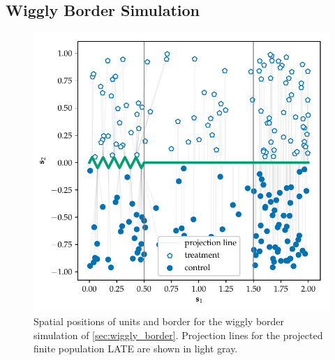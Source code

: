 \subsection{Wiggly Border Simulation}
\label{sec:wiggly_border}

\begin{figure}[tb]
\centering
\includegraphics[height=0.35\textheight]{figures/wiggly_boundaries_setup.pdf}
\caption{
    \label{fig:wiggly_boundaries_setup}
    Spatial positions of units and border for the wiggly border simulation of \autoref{sec:wiggly_border}. Projection lines for the projected finite population LATE are shown in light gray.}
\end{figure}


